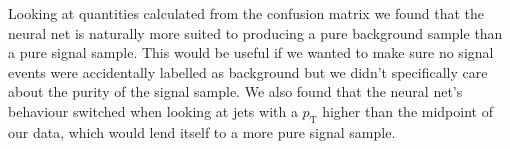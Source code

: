 \documentclass[11pt]{article}
\numberwithin{equation}{section}
\numberwithin{figure}{section}
\numberwithin{table}{section}
\begin{document}
Looking at quantities calculated from the confusion matrix we found that the neural net is naturally more suited to producing a pure background sample than a pure signal sample. This would be useful if we wanted to make sure no signal events were accidentally labelled as background but we didn't specifically care about the purity of the signal sample. We also found that the neural net's behaviour switched when looking at jets with a $p_\mathrm{T}$ higher than the midpoint of our data, which would lend itself to a more pure signal sample. 

\newpage
\printbibliography
\end{document}
